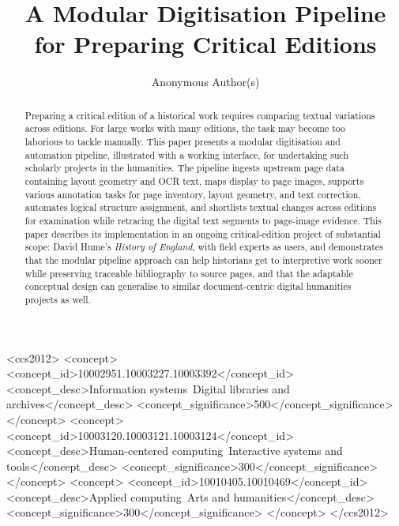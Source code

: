 \documentclass[sigconf,natbib,anonymous]{acmart}
\begin{document}
\raggedbottom

\title{A Modular Digitisation Pipeline for Preparing Critical Editions}

\author{Anonymous Author(s)}
\renewcommand{\shortauthors}{Anonymous Author(s)}

\begin{abstract}
Preparing a critical edition of a historical work requires comparing textual variations across editions.
For large works with many editions, the task may become too laborious to tackle manually.
This paper presents a modular digitisation and automation pipeline, illustrated with a working interface, for undertaking such scholarly projects in the humanities.
The pipeline ingests upstream page data containing layout geometry and OCR text, maps display to page images, supports various annotation tasks for page inventory, layout geometry, and text correction, automates logical structure assignment, and shortlists textual changes across editions for examination while retracing the digital text segments to page-image evidence.
This paper describes its implementation in an ongoing critical-edition project of substantial scope: David Hume's \emph{History of England}, with field experts as users, and demonstrates that the modular pipeline approach can help historians get to interpretive work sooner while preserving traceable bibliography to source pages, and that the adaptable conceptual design can generalise to similar document-centric digital humanities projects as well.
\end{abstract}

\begin{CCSXML}
<ccs2012>
 <concept>
  <concept_id>10002951.10003227.10003392</concept_id>
  <concept_desc>Information systems~Digital libraries and archives</concept_desc>
  <concept_significance>500</concept_significance>
 </concept>
 <concept>
  <concept_id>10003120.10003121.10003124</concept_id>
  <concept_desc>Human-centered computing~Interactive systems and tools</concept_desc>
  <concept_significance>300</concept_significance>
 </concept>
 <concept>
  <concept_id>10010405.10010469</concept_id>
  <concept_desc>Applied computing~Arts and humanities</concept_desc>
  <concept_significance>300</concept_significance>
 </concept>
</ccs2012>
\end{CCSXML}

\end{document}
